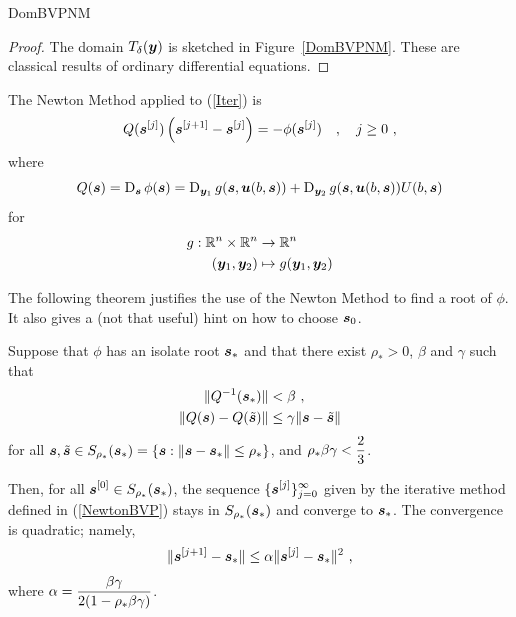 {DomBVPNM}

\begin{proof}
The domain $T_\delta(\bm{y})$ is sketched in Figure~\ref{DomBVPNM}.
These are classical results of ordinary differential equations.
\end{proof}

The Newton Method applied to (\ref{Iter}) is
\begin{equation} \label{NewtonBVP}
  Q(\bm{s}^{[j]}) \left( \bm{s}^{[j+1]} - \bm{s}^{[j]} \right)
  = -\phi(\bm{s}^{[j]}) \quad , \quad j \geq 0 \ ,
\end{equation}
where
\[
Q(\bm{s}) = \operatorname{D}_{\bm{s}} \phi(\bm{s})
= \operatorname{D}_{\bm{y}_1}g(\bm{s},\bm{u}(b,\bm{s}))
+ \operatorname{D}_{\bm{y}_2}g(\bm{s},\bm{u}(b,\bm{s})) U(b,\bm{s})
\]
for
\begin{align*}
g:\mathbb{R}^n \times \mathbb{R}^n &\to \mathbb{R}^n \\
(\bm{y}_1,\bm{y}_2) &\mapsto g(\bm{y}_1,\bm{y}_2)
\end{align*}

The following theorem justifies the use of the Newton Method to find a
root of $\phi$.  It also gives a (not that useful) hint
on how to choose $\bm{s}_0$.

\begin{theorem}
Suppose that $\phi$ has an isolate root $\bm{s}_\ast$
and that there exist $\rho_\ast>0$, $\beta$ and $\gamma$ such that
\begin{align*}
\| Q^{-1}(\bm{s}_\ast) \| &< \beta \ , \\
\| Q(\bm{s}) - Q(\tilde{\bm{s}}) \| &\leq \gamma
\| \bm{s} - \tilde{\bm{s}}\|
\end{align*}
for all $\bm{s}, \tilde{\bm{s}} \in S_{\rho_\ast}(\bm{s}_\ast) =
\{ \bm{s} : \| \bm{s} - \bm{s}_\ast \| \leq \rho_\ast \}$,
and $\displaystyle \rho_\ast \beta \gamma < \frac{2}{3}$.

Then, for all $\displaystyle \bm{s}^{[0]} \in S_{\rho_\ast}(\bm{s}_\ast)$, the
sequence $\displaystyle \{\bm{s}^{[j]}\}_{j=0}^\infty$ given by the
iterative method defined in (\ref{NewtonBVP}) stays in
$S_{\rho_\ast}(\bm{s}_\ast)$
and converge to $\bm{s}_\ast$.  The convergence is quadratic; namely,
\begin{equation} \label{contract}
\| \bm{s}^{[j+1]} - \bm{s}_\ast \| \leq \alpha \|
\bm{s}^{[j]} - \bm{s}_\ast \|^2 \ ,
\end{equation}
where $\displaystyle \alpha = \frac{\beta\gamma}{2(1-\rho_\ast \beta\gamma)}$.
\label{CforNewton}
\end{theorem}


